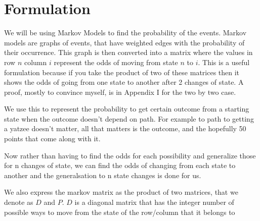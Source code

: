 \section{Formulation}
	
	We will be using Markov Models to find the probability of the events. 
Markov models are graphs of events, that have weighted edges with the probability of their occurrence. 
This graph is then converted into a matrix where the values in row $n$ column $i$ represent the odds of moving from state $n$ to $i$. 
This is a useful formulation because if you take the product of two of these matrices then it shows the odds of going from one state to another after 2 changes of state. 
A proof, mostly to convince myself, is in Appendix I for the two by two case.

We use this to represent the probability to get certain outcome from a starting state when the outcome doesn't depend on path. For example to path to getting a yatzee doesn't matter, all that matters is the outcome, and the hopefully 50 points that come along with it. 

Now rather than having to find the odds for each possibility and generalize those for n changes of state, we can find the odds of changing from each state to another and the generalsation to n state changes is done for us. 

We also express the markov matrix as the product of two matrices, that we denote as $D$ and $P$. $D$ is a diagonal matrix that has the integer number of possible ways to move from the state of the row/column that it belongs to

